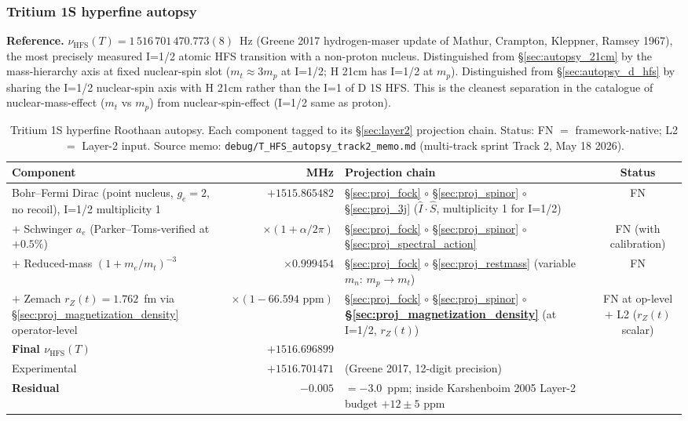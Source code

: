 \documentclass[11pt]{article}
\begin{document}
\subsubsection{Tritium 1S hyperfine autopsy}
\label{sec:autopsy_t_hfs}

\textbf{Reference.}  $\nu_\text{HFS}(T) = 1\,516\,701\,470.773(8)$~Hz
(Greene 2017 hydrogen-maser update of Mathur, Crampton, Kleppner,
Ramsey 1967), the most precisely measured I=1/2 atomic HFS transition
with a non-proton nucleus.  Distinguished from \S\ref{sec:autopsy_21cm}
by the mass-hierarchy axis at fixed nuclear-spin slot
($m_t \approx 3 m_p$ at I=1/2; H 21cm has I=1/2 at $m_p$).
Distinguished from \S\ref{sec:autopsy_d_hfs} by sharing the I=1/2
nuclear-spin axis with H 21cm rather than the I=1 of D 1S HFS.  This
is the cleanest separation in the catalogue of nuclear-mass-effect
($m_t$ vs $m_p$) from nuclear-spin-effect (I=1/2 same as proton).

\begin{table}[h]
\centering\small
\begin{tabular}{p{4.5cm} r p{6cm} c}
\toprule
Component & MHz & Projection chain & Status \\
\midrule
Bohr--Fermi Dirac (point nucleus, $g_e=2$, no recoil), I=1/2
multiplicity 1 & $+1515.865482$ &
\S\ref{sec:proj_fock} $\circ$ \S\ref{sec:proj_spinor} $\circ$
\S\ref{sec:proj_3j} ($\hat{I}\cdot\hat{S}$, multiplicity 1 for I=1/2) & FN \\
$+$ Schwinger $a_e$ (Parker--Toms-verified at $+0.5\%$) &
$\times (1+\alpha/2\pi)$ &
\S\ref{sec:proj_fock} $\circ$ \S\ref{sec:proj_spinor} $\circ$
\S\ref{sec:proj_spectral_action} & FN (with calibration) \\
$+$ Reduced-mass $(1+m_e/m_t)^{-3}$ & $\times 0.999454$ &
\S\ref{sec:proj_fock} $\circ$ \S\ref{sec:proj_restmass} (variable
$m_n$: $m_p \to m_t$) & FN \\
$+$ Zemach $r_Z(t)=1.762$~fm via \S\ref{sec:proj_magnetization_density}
operator-level & $\times (1 - 66.594 \text{~ppm})$ &
\S\ref{sec:proj_fock} $\circ$ \S\ref{sec:proj_spinor} $\circ$
\textbf{\S\ref{sec:proj_magnetization_density}} (at I=1/2, $r_Z(t)$) & FN at op-level
$+$ L2 ($r_Z(t)$ scalar) \\
\midrule
\textbf{Final $\nu_\text{HFS}(T)$} & $+1516.696899$ & & \\
Experimental & $+1516.701471$ & (Greene 2017, 12-digit precision) & \\
\textbf{Residual} & $-0.005$ & $= -3.0$~ppm; inside Karshenboim 2005
Layer-2 budget $+12 \pm 5$ ppm & \\
\bottomrule
\end{tabular}
\caption{Tritium 1S hyperfine Roothaan autopsy.  Each component
tagged to its \S\ref{sec:layer2} projection chain. Status: FN $=$
framework-native; L2 $=$ Layer-2 input.  Source memo:
\texttt{debug/T\_HFS\_autopsy\_track2\_memo.md} (multi-track sprint
Track 2, May 18 2026).}
\label{tab:autopsy_t_hfs}
\end{table}
\end{document}
